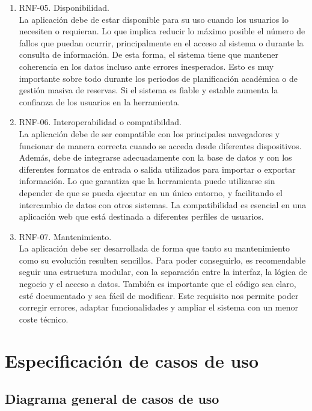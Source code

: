 \begin{enumerate}
	\item RNF-05. Disponibilidad.
	\\La aplicación debe de estar disponible para su uso cuando los usuarios lo necesiten o requieran. Lo que implica reducir lo máximo posible el número de fallos que puedan ocurrir, principalmente en el acceso al sistema o durante la consulta de información. De esta forma, el sistema tiene que mantener coherencia en los datos incluso ante errores inesperados. Esto es muy importante sobre todo durante los periodos de planificación académica o de gestión masiva de reservas. Si el sistema es fiable y estable aumenta la confianza de los usuarios en la herramienta.
	\item RNF-06. Interoperabilidad o compatibildad.
	\\La aplicación debe de ser compatible con los principales navegadores y funcionar de manera correcta cuando se acceda desde diferentes dispositivos. Además, debe de integrarse adecuadamente con la base de datos y con los diferentes formatos de entrada o salida utilizados para importar o exportar información. Lo que garantiza que la herramienta puede utilizarse sin depender de que se pueda ejecutar en un único entorno, y facilitando el intercambio de datos con otros sistemas. La compatibilidad es esencial en una aplicación web que está destinada a diferentes perfiles de usuarios.
	\item RNF-07. Mantenimiento.
	\\La aplicación debe ser desarrollada de forma que tanto su mantenimiento como su evolución resulten sencillos. Para poder conseguirlo, es recomendable seguir una estructura modular, con la separación entre la interfaz, la lógica de negocio y el acceso a datos. También es importante que el código sea claro, esté documentado y sea fácil de modificar. Este requisito nos permite poder corregir errores, adaptar funcionalidades y ampliar el sistema con un menor coste técnico.
\end{enumerate}

\section{Especificación de casos de uso}

\subsection{Diagrama general de casos de uso}


